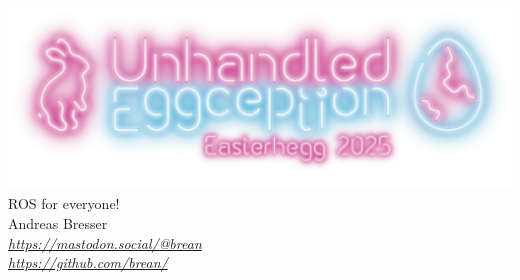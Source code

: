 \documentclass[aspectratio=169]{beamer}
\begin{document}
\begin{frame}{}
    \centering
    \includegraphics[width=.7\textwidth]{figures/logo_easterhegg.png}\\
    ROS for everyone!
    \vspace{1em}\\
    Andreas Bresser\\
    \tiny{
    \textit{\url{https://mastodon.social/@brean}}\\
    \textit{\url{https://github.com/brean/}}}
\end{frame}
\end{document}
